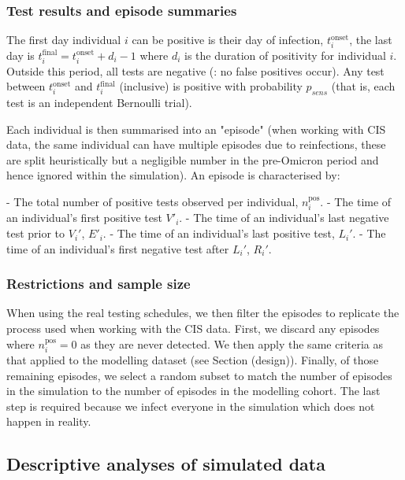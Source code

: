 \documentclass[main.tex]{subfiles}
\begin{document}
\subsubsection{Test results and episode summaries}

The first day individual $i$ can be positive is their day of infection, $t_i^\text{onset}$, the last day is $t_i^\text{final} = t_i^\text{onset} + d_i - 1$ where $d_i$ is the duration of positivity for individual $i$.
Outside this period, all tests are negative (\ie: no false positives occur). 
Any test between $t_i^\text{onset}$ and $t_i^\text{final}$ (inclusive) is positive with probability $p_{sens}$ (that is, each test is an independent Bernoulli trial).

Each individual is then summarised into an "episode" (when working with CIS data, the same individual can have multiple episodes due to reinfections, these are split heuristically but a negligible number in the pre-Omicron period and hence ignored within the simulation).
An episode is characterised by:

- The total number of positive tests observed per individual, $n_i^\text{pos}$.
- The time of an individual's first positive test $V'_i$.
- The time of an individual's last negative test prior to $V_i'$, $E'_i$.
- The time of an individual's last positive test, $L_i'$.
- The time of an individual's first negative test after $L_i'$, $R_i'$.

\subsubsection{Restrictions and sample size}

When using the real testing schedules, we then filter the episodes to replicate the process used when working with the CIS data.
First, we discard any episodes where $n_i^\text{pos}=0$ as they are never detected.
We then apply the same criteria as that applied to the modelling dataset (see Section \@ref(design)).
Finally, of those remaining episodes, we select a random subset to match the number of episodes in the simulation to the number of episodes in the modelling cohort.
The last step is required because we infect everyone in the simulation which does not happen in reality.

\subsection{Descriptive analyses of simulated data}
\end{document}
